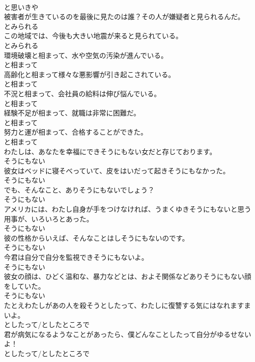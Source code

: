 \documentclass[8pt]{extreport}
\begin{document}
\begin{CJK}{UTF8}{min}
\\	と思いきや
\\	被害者が生きているのを最後に見たのは誰？その人が嫌疑者と見られるんだ。	
\\	とみられる
\\	この地域では、今後も大きい地震が来ると見られている。	
\\	とみられる
\\	環境破壊と相まって、水や空気の汚染が進んでいる。	
\\	と相まって
\\	高齢化と相まって様々な悪影響が引き起こされている。	
\\	と相まって
\\	不況と相まって、会社員の給料は伸び悩んでいる。	
\\	と相まって
\\	経験不足が相まって、就職は非常に困難だ。	
\\	と相まって
\\	努力と運が相まって、合格することができた。	
\\	と相まって
\\	わたしは、あなたを幸福にできそうにもない女だと存じております。	
\\	そうにもない
\\	彼女はベッドに寝そべっていて、皮をはいだって起きそうにもなかった。	
\\	そうにもない
\\	でも、そんなこと、ありそうにもないでしょう？	
\\	そうにもない
\\	アメリカには、わたし自身が手をつけなければ、うまくゆきそうにもないと思う用事が、いろいろとあった。	
\\	そうにもない
\\	彼の性格からいえば、そんなことはしそうにもないのです。	
\\	そうにもない
\\	今君は自分で自分を監視できそうにもないよ。	
\\	そうにもない
\\	彼女の顔は、ひどく温和な、暴力などとは、およそ関係などありそうにもない顔をしていた。	
\\	そうにもない
\\	たとえわたしがあの人を殺そうとしたって、わたしに復讐する気にはなれますまいよ。	
\\	としたって/としたところで
\\	君が病気になるようなことがあったら、僕どんなことしたって自分がゆるせないよ！	
\\	としたって/としたところで

\end{CJK}
\end{document}
